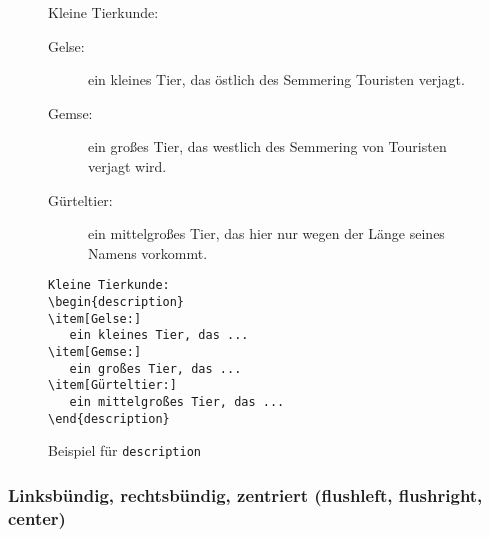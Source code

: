 \begin{figure}[!htbp]  %
\oben{\textwidth}
\exa
Kleine Tierkunde:
\begin{description}
\item[Gelse:]
   ein kleines Tier, das
   östlich des Semmering Touristen verjagt.
\item[Gemse:]
   ein großes Tier, das
   westlich des Semmering von Touristen verjagt wird.
\item[Gürteltier:]
   ein mittelgroßes Tier, das
   hier nur wegen der Länge seines Namens vorkommt.
\end{description}
\exb
\begin{verbatim}
Kleine Tierkunde:
\begin{description}
\item[Gelse:]
   ein kleines Tier, das ...
\item[Gemse:]
   ein großes Tier, das ...
\item[Gürteltier:]
   ein mittelgroßes Tier, das ...
\end{description}
\end{verbatim}
\exc
\unten
\caption{Beispiel für \texttt{description}} \label{desc}
\end{figure}
 
{\hfuzz=2pt\relax %
\subsubsection
          [Flattersatz (flush\-left, flush\-right, center)]
          {Linksbündig, rechtsbündig, zentriert
                       (flush\-left, flush\-right, center)}
}

